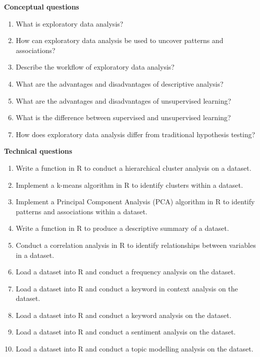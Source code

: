 \documentclass[
  letterpaper,
  DIV=11,
  numbers=noendperiod]{scrreport}
\providecommand{\tightlist}{%
  \setlength{\itemsep}{0pt}\setlength{\parskip}{0pt}}\usepackage{longtable,booktabs,array}
\theoremstyle{definition}
\theoremstyle{remark}
\begin{document}
\begin{tcolorbox}[enhanced jigsaw, leftrule=.75mm, bottomrule=.15mm, opacityback=0, breakable, left=2mm, colback=white, toprule=.15mm, arc=.35mm, rightrule=.15mm]

 \textbf{Conceptual questions}

\begin{enumerate}
\def\labelenumi{\arabic{enumi}.}
\tightlist
\item
  What is exploratory data analysis?
\item
  How can exploratory data analysis be used to uncover patterns and
  associations?
\item
  Describe the workflow of exploratory data analysis?
\item
  What are the advantages and disadvantages of descriptive analysis?
\item
  What are the advantages and disadvantages of unsupervised learning?
\item
  What is the difference between supervised and unsupervised learning?
\item
  How does exploratory data analysis differ from traditional hypothesis
  testing?
\end{enumerate}

\end{tcolorbox}

\begin{tcolorbox}[enhanced jigsaw, leftrule=.75mm, bottomrule=.15mm, opacityback=0, breakable, left=2mm, colback=white, toprule=.15mm, arc=.35mm, rightrule=.15mm]

 \textbf{Technical questions}

\begin{enumerate}
\def\labelenumi{\arabic{enumi}.}
\tightlist
\item
  Write a function in R to conduct a hierarchical cluster analysis on a
  dataset.
\item
  Implement a k-means algorithm in R to identify clusters within a
  dataset.
\item
  Implement a Principal Component Analysis (PCA) algorithm in R to
  identify patterns and associations within a dataset.
\item
  Write a function in R to produce a descriptive summary of a dataset.
\item
  Conduct a correlation analysis in R to identify relationships between
  variables in a dataset.
\item
  Load a dataset into R and conduct a frequency analysis on the dataset.
\item
  Load a dataset into R and conduct a keyword in context analysis on the
  dataset.
\item
  Load a dataset into R and conduct a keyword analysis on the dataset.
\item
  Load a dataset into R and conduct a sentiment analysis on the dataset.
\item
  Load a dataset into R and conduct a topic modelling analysis on the
  dataset.
\end{enumerate}

\end{tcolorbox}
\end{document}
